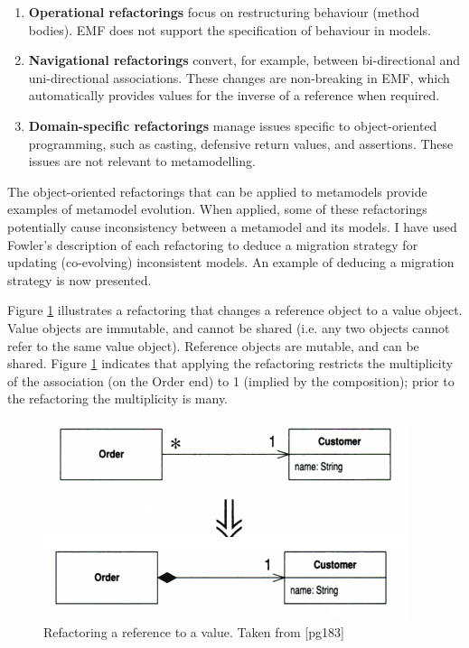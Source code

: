 \begin{enumerate}
	\item \textbf{Operational refactorings} focus on restructuring behaviour (method bodies). EMF does not support the specification of behaviour in models.
	\item \textbf{Navigational refactorings} convert, for example, between bi-directional and uni-directional associations. These changes are non-breaking in EMF, which automatically provides values for the inverse of a reference when required.
	\item \textbf{Domain-specific refactorings} manage issues specific to object-oriented programming, such as casting, defensive return values, and assertions. These issues are not relevant to metamodelling.
\end{enumerate}

The object-oriented refactorings that can be applied to metamodels provide examples of metamodel evolution. When applied, some of these refactorings potentially cause inconsistency between a metamodel and its models. I have used Fowler's description of each refactoring to deduce a migration strategy for updating (co-evolving) inconsistent models. An example of deducing a migration strategy is now presented.

Figure \ref{fig:refactoring} illustrates a refactoring that changes a reference object to a value object. Value objects are immutable, and cannot be shared (i.e. any two objects cannot refer to the same value object). Reference objects are mutable, and can be shared. Figure \ref{fig:refactoring} indicates that applying the refactoring restricts the multiplicity of the association (on the Order end) to 1 (implied by the composition); prior to the refactoring the multiplicity is many.

\begin{figure}[htbp]
  \begin{center}
    \leavevmode
    \includegraphics[scale=0.5]{refactoring.png}
  \end{center}
  \caption{Refactoring a reference to a value. Taken from \cite{fowler99refactoring}[pg183]}
  \label{fig:refactoring}
\end{figure}

